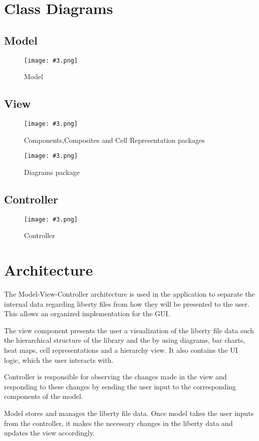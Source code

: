 \documentclass[10pt,a4paper]{report}
\newcommand{\includeimage}[5]{
    \begin{figure}[H]
        #1
        \texttt{[image: \#3.png]}
        \caption{#4}
        \label{fig:#5}
    \end{figure}
}
\begin{document}
\chapter{Class Diagrams}
\section{Model}
\includeimage{}{0.1}{Model}{Model}{ModelSecond}
\section{View}
\includeimage{}{0.15}{View_Cell_Comp}{Components,Composites and Cell Representation packages}{View_Cell_Comp}
\includeimage{}{0.04}{View_Diagrams}{Diagrams package}{View_Diagrams}
\section{Controller}
\includeimage{}{0.062}{Controllerv}{Controller}{ControllerSecond}
\chapter{Architecture}{
The Model-View-Controller architecture is used in the application to separate the internal data regarding liberty files
from how they will be presented to the user. This allows an organized implementation for the GUI.\newline

The view component presents the user a visualization of the liberty file data
such the hierarchical structure of the library and the by using diagrams, bar charts, heat maps, cell representations and a hierarchy view.
It also contains the UI logic, which the user interacts with.\newline 

Controller is responsible for observing the changes made in the view and responding to these changes by sending 
the user input to the corresponding components of the model. \newline

Model stores and manages the liberty file data. Once model takes the user inputs from the controller, it makes the necessary changes
in the liberty data and updates the view accordingly.\newline}
\end{document}

